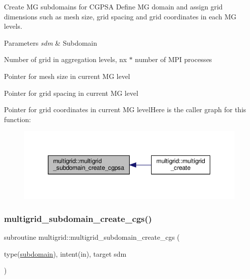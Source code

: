Create MG subdomains for C\+G\+P\+SA  Define MG domain and assign grid dimensions such as mesh size, grid spacing and grid coordinates in each MG levels. 


\begin{DoxyParams}{Parameters}
{\em sdm} & Subdomain \\
\hline
\end{DoxyParams}
Number of grid in aggregation levels, nx $\ast$ number of M\+PI processes

Pointer for mesh size in current MG level

Pointer for grid spacing in current MG level

Pointer for grid coordinates in current MG levelHere is the caller graph for this function\+:
\nopagebreak
\begin{figure}[H]
\begin{center}
\leavevmode
\includegraphics[width=345pt]{namespacemultigrid_aa2eb7c900fb5875f844c04c27c552373_icgraph}
\end{center}
\end{figure}
\mbox{\label{namespacemultigrid_acb52ce247bf637e69274d8da44d1f159}} 
\subsubsection{\texorpdfstring{multigrid\+\_\+subdomain\+\_\+create\+\_\+cgs()}{multigrid\_subdomain\_create\_cgs()}}
{\footnotesize\ttfamily subroutine multigrid\+::multigrid\+\_\+subdomain\+\_\+create\+\_\+cgs (\begin{DoxyParamCaption}\item[{type(\hyperlink{structgeometry_1_1subdomain}{subdomain}), intent(in), target}]{sdm }\end{DoxyParamCaption})}



